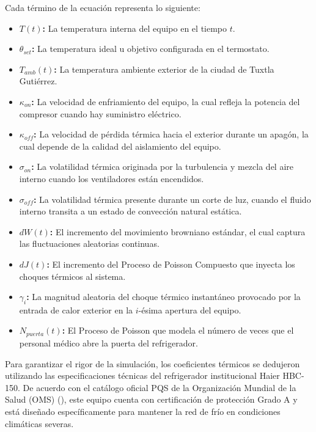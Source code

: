 \documentclass[
  spanish,
  letterpaper,
  DIV=11,
  numbers=noendperiod]{scrreprt}
\providecommand{\tightlist}{%
  \setlength{\itemsep}{0pt}\setlength{\parskip}{0pt}}
\theoremstyle{plain}
\theoremstyle{plain}
\theoremstyle{plain}
\theoremstyle{definition}
\theoremstyle{remark}
\begin{document}
Cada término de la ecuación representa lo siguiente:

\begin{itemize}
\tightlist
\item
  \textbf{\(T(t)\):} La temperatura interna del equipo en el tiempo
  \(t\).
\item
  \textbf{\(\theta_{set}\):} La temperatura ideal u objetivo configurada
  en el termostato.
\item
  \textbf{\(T_{amb}(t)\):} La temperatura ambiente exterior de la ciudad
  de Tuxtla Gutiérrez.
\item
  \textbf{\(\kappa_{on}\):} La velocidad de enfriamiento del equipo, la
  cual refleja la potencia del compresor cuando hay suministro
  eléctrico.
\item
  \textbf{\(\kappa_{off}\):} La velocidad de pérdida térmica hacia el
  exterior durante un apagón, la cual depende de la calidad del
  aislamiento del equipo.
\item
  \textbf{\(\sigma_{on}\):} La volatilidad térmica originada por la
  turbulencia y mezcla del aire interno cuando los ventiladores están
  encendidos.
\item
  \textbf{\(\sigma_{off}\):} La volatilidad térmica presente durante un
  corte de luz, cuando el fluido interno transita a un estado de
  convección natural estática.
\item
  \textbf{\(dW(t)\):} El incremento del movimiento browniano estándar,
  el cual captura las fluctuaciones aleatorias continuas.
\item
  \textbf{\(dJ(t)\):} El incremento del Proceso de Poisson Compuesto que
  inyecta los choques térmicos al sistema.
\item
  \textbf{\(\gamma_i\):} La magnitud aleatoria del choque térmico
  instantáneo provocado por la entrada de calor exterior en la
  \(i\)-ésima apertura del equipo.
\item
  \textbf{\(N_{puerta}(t)\):} El Proceso de Poisson que modela el número
  de veces que el personal médico abre la puerta del refrigerador.
\end{itemize}

Para garantizar el rigor de la simulación, los coeficientes térmicos se
dedujeron utilizando las especificaciones técnicas del refrigerador
institucional Haier HBC-150. De acuerdo con el catálogo oficial PQS de
la Organización Mundial de la Salud (OMS)
(), este equipo cuenta con certificación de protección Grado A y
está diseñado específicamente para mantener la red de frío en
condiciones climáticas severas.
\end{document}
